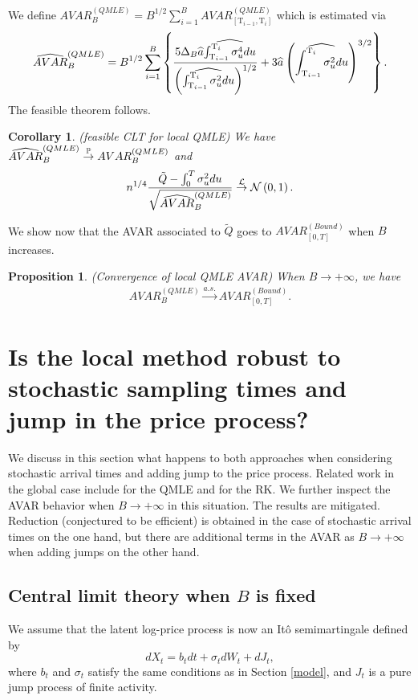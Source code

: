 \documentclass[11pt]{article}
\numberwithin{equation}{section}
\newcommand{\Tau}{\mathrm{T}}
\theoremstyle{plain}
\newtheorem{QMLEcor}[RK0]{Corollary}
\newtheorem{propAVARQMLE}[RK0]{Proposition}
\theoremstyle{remark}
\begin{document}
We define $AVAR_{B}^{(QMLE)} = B^{1/2} \sum_{i=1}^B AVAR_{[\Tau_{i-1}, \Tau_i]}^{(QMLE)}$ which is estimated via 
$$ \widehat{AVAR}_B^{(QMLE)} = B^{1/2} \sum_{i=1}^B \l\{\frac{ 5 \Delta_B \widehat{a} \widehat{\int_{\Tau_{i-1}}^{\Tau_i} \sigma_u^4 du}}{ \l( \widehat{\int_{\Tau_{i-1}}^{\Tau_i} \sigma_u^2 du}\r)^{1/2} } + 3 \widehat{a} \l(\widehat{\int_{\Tau_{i-1}}^{\Tau_i} \sigma_u^2 du}\r)^{3/2} \r\}.$$
The feasible theorem follows.
\begin{QMLEcor}
\label{QMLEcor} (feasible CLT for local QMLE) We have $\widehat{AVAR}_B^{(QMLE)} \overset{\mathbb{P}}{\rightarrow} AVAR_{B}^{(QMLE)}$ and
\begin{eqnarray}
\label{QMLEthcor2}
n^{1/4} \frac{ \tilde{Q} - \int_0^T \sigma_u^2 du}{\sqrt{\widehat{AVAR}_B^{(QMLE)}}}\overset{{\cal L}}{\rightarrow}  {\cal N} \left(0, 1\right).
\end{eqnarray}
\end{QMLEcor}
We show now that the AVAR associated to $\tilde{Q}$ goes to $AVAR_{[0,T]}^{(Bound)}$ when $B$ increases.
\begin{propAVARQMLE} \label{propAVARQMLE}
(Convergence of local QMLE AVAR) When $B \to +\infty$, we have
\begin{eqnarray}
\label{eqAVARQMLE}
AVAR_{B}^{(QMLE)} \overset{a.s.}{\rightarrow} AVAR_{[0,T]}^{(Bound)}.
\end{eqnarray}
\end{propAVARQMLE}


\section{Is the local method robust to stochastic sampling times and jump in the price process?}
\label{robustness}
We discuss in this section what happens to both approaches when considering stochastic arrival times and adding jump to the price process. Related work in the global case include \cite{da2017moving} for the QMLE and \cite{varneskov2016flat} for the RK. We further inspect the AVAR behavior when $B \rightarrow +\infty$ in this situation. The results are mitigated. Reduction (conjectured to be efficient) is obtained in the case of stochastic arrival times on the one hand, but there are additional terms in the AVAR as $B \rightarrow +\infty$ when adding jumps on the other hand. 

\subsection{Central limit theory when $B$ is fixed}
We assume that the latent log-price process is now an It\^{o} semimartingale defined by $$dX_t = b_t dt + \sigma_t dW_t + dJ_t,$$
where $b_t$ and $\sigma_t$ satisfy the same conditions as in Section \ref{model}, and $J_t$ is a pure jump process of finite activity.
\end{document}
